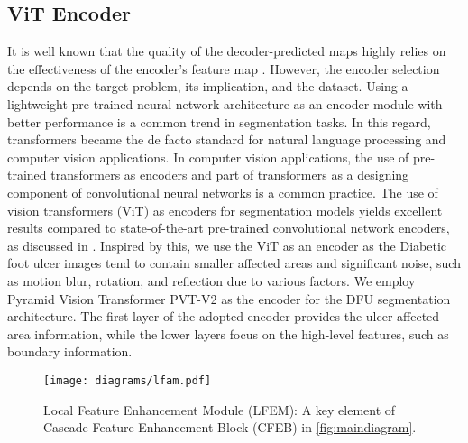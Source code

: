 \documentclass[review]{elsarticle}
\begin{document}
\subsection{ViT Encoder}
It is well known that the quality of the decoder-predicted maps highly relies on the effectiveness of the encoder's feature map \cite{bhojanapalli2021understanding,xie2021segformer}. However, the encoder selection depends on the target problem, its implication, and the dataset. Using a lightweight pre-trained neural network architecture as an encoder module with better performance is a common trend in segmentation tasks. In this regard, transformers became the de facto standard for natural language processing and computer vision applications. In computer vision applications, the use of pre-trained transformers as encoders and part of transformers as a designing component of convolutional neural networks is a common practice. The use of vision transformers (ViT) as encoders for segmentation models yields excellent results compared to state-of-the-art pre-trained convolutional network encoders, as discussed in \cite{bhojanapalli2021understanding,xie2021segformer}. Inspired by this, we use the ViT as an encoder as the Diabetic foot ulcer images tend to contain smaller affected areas and significant noise, such as motion blur, rotation, and reflection due to various factors. We employ Pyramid Vision Transformer PVT-V2 \cite{wang2022pvt} as the encoder for the DFU segmentation architecture. The first layer of the adopted encoder provides the ulcer-affected area information, while the lower layers focus on the high-level features, such as boundary information.

\begin{figure}[ht!]
	\texttt{[image: diagrams/lfam.pdf]}
	\caption{Local Feature Enhancement Module (LFEM): A key element of Cascade Feature Enhancement Block (CFEB) in \ref{fig:maindiagram}. }
	\label{fig:lfam}
\end{figure}
\end{document}
